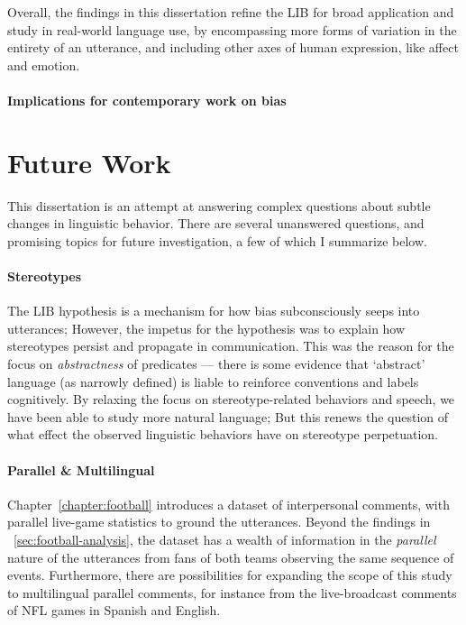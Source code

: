 Overall, the findings in this dissertation refine the LIB for broad application and study in real-world language use, by encompassing more forms of variation in the entirety of an utterance, and including other axes of human expression, like affect and emotion. 


\paragraph{Implications for contemporary work on bias}


\section{Future Work}

This dissertation is an attempt at answering complex questions about subtle changes in linguistic behavior. There are several unanswered questions, and promising topics for future investigation, a few of which I summarize below.

\paragraph{Stereotypes} The LIB hypothesis is a mechanism for how bias subconsciously seeps into utterances; However, the impetus for the hypothesis was to explain how stereotypes persist and propagate in communication. This was the reason for the focus on \emph{abstractness} of predicates --- there is some evidence that `abstract' language (as narrowly defined) is liable to reinforce conventions and labels cognitively. By relaxing the focus on stereotype-related behaviors and speech, we have been able to study more natural language; But this renews the question of what effect the observed linguistic behaviors have on stereotype perpetuation.

\paragraph{Parallel \& Multilingual} Chapter~\ref{chapter:football} introduces a dataset of interpersonal comments, with parallel live-game statistics to ground the utterances. Beyond the findings in \textsection~\ref{sec:football-analysis}, the dataset has a wealth of information in the \emph{parallel} nature of the utterances from fans of both teams observing the same sequence of events. Furthermore, there are possibilities for expanding the scope of this study to multilingual parallel comments, for instance from the live-broadcast comments of NFL games in Spanish and English. 

